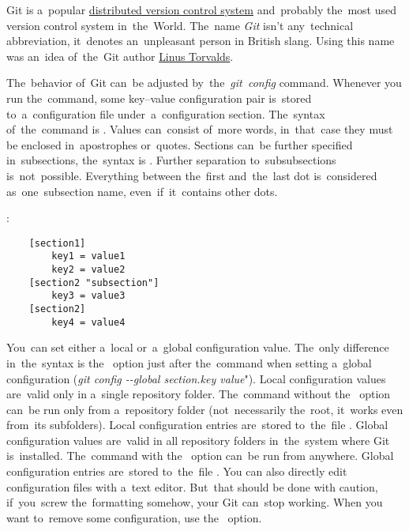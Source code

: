 \label{git}
Git is a~popular \hyperref[distributedversioncontrolsystem]{distributed version control system} and~probably the~most used version control system in~the~World.
The~name \textit{Git} isn't any~technical abbreviation, it~denotes an~unpleasant person in British slang.
Using this name was an~idea of~the~Git author \href{https://en.wikipedia.org/wiki/Linus_Torvalds}{Linus Torvalds}.

\label{gitconfig}
The~behavior of~Git can~be adjusted by~the~\textit{git~config} command.
Whenever you run the~command, some key--value configuration pair is~stored to~a~configuration file under~a~configuration section.
The~syntax of~the~command is .
Values can~consist of~more words, in~that~case they must be enclosed in~apostrophes or~quotes.
Sections can~be further specified in~subsections, the~syntax is .
Further separation to~subsubsections is~not~possible.
Everything between the~first and~the~last dot is~considered as~one~subsection name, even~if~it~contains other dots.

:
\begin{lstlisting}
    [section1]
        key1 = value1
        key2 = value2
    [section2 "subsection"]
        key3 = value3
    [section2]
        key4 = value4
\end{lstlisting}
\newline

\enlargethispage{-8mm}
\noindent  You~can set either a~local or~a~global configuration value.
The~only difference in~the~syntax is the~ option just after the~command when setting a~global configuration (\textit{git config \mbox{-{}-global} section.key value}").
Local configuration values are~valid only in a~single repository folder.
The~command without the~ option can~be run only from a~repository folder (not~necessarily the~root, it~works even from~its subfolders).
Local configuration entries are~stored to~the~file .
Global configuration values are~valid in all repository folders in~the~system where Git is~installed.
The~command with the~ option can~be run from anywhere.
Global configuration entries are~stored to~the~file .
You can also directly edit configuration files with a~text editor.
But~that should be done with caution, if~you~screw the~formatting somehow, your Git can~stop working.
When you want to~remove some configuration, use the~ option.

